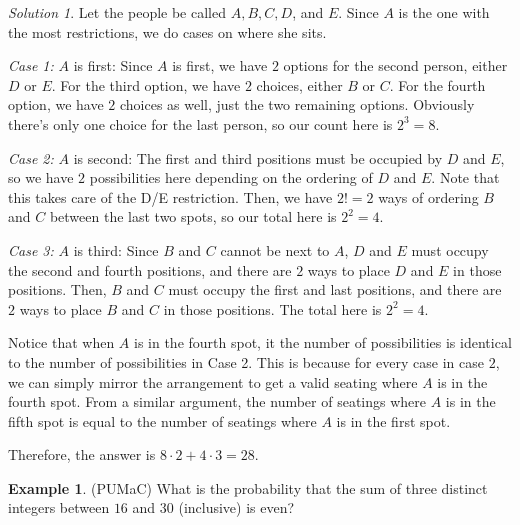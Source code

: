 \documentclass[l1pt]{article}
\theoremstyle{plain}
\theoremstyle{definition}
\newtheorem{example}[thm]{Example}
\theoremstyle{remark}
\newtheorem*{solution}{Solution}
\begin{document}
\begin{solution}
Let the people be called $A, B, C, D$, and $E$. Since $A$ is the one with the most restrictions, we do cases on where she sits. 
\newline

\textit{Case 1:} $A$ is first: Since $A$ is first, we have $2$ options for the second person, either $D$ or $E$. For the third option, we have $2$ choices, either $B$ or $C$. For the fourth option, we have $2$ choices as well, just the two remaining options. Obviously there's only one choice for the last person, so our count here is $2^3=8$.
\newline

\textit{Case 2:} $A$ is second: The first and third positions must be occupied by $D$ and $E$, so we have $2$ possibilities here depending on the ordering of $D$ and $E$. Note that this takes care of the D/E restriction. Then, we have $2!=2$ ways of ordering $B$ and $C$ between the last two spots, so our total here is $2^2=4$.
\newline

\textit{Case 3:} $A$ is third: Since $B$ and $C$ cannot be next to $A$, $D$ and $E$ must occupy the second and fourth positions, and there are $2$ ways to place $D$ and $E$ in those positions. Then, $B$ and $C$ must occupy the first and last positions, and there are $2$ ways to place $B$ and $C$ in those positions. The total here is $2^2=4$.
\newline

Notice that when $A$ is in the fourth spot, it the number of possibilities is identical to the number of possibilities in Case 2. This is because for every case in case $2$, we can simply mirror the arrangement to get a valid seating where $A$ is in the fourth spot. From a similar argument, the number of seatings where $A$ is in the fifth spot is equal to the number of seatings where $A$ is in the first spot.


Therefore, the answer is $8\cdot 2+4\cdot 3=28$.
\end{solution}



\begin{example}
(PUMaC) What is the probability that the sum of three distinct integers between $16$ and $30$ (inclusive) is even?
\end{example}
\end{document}
